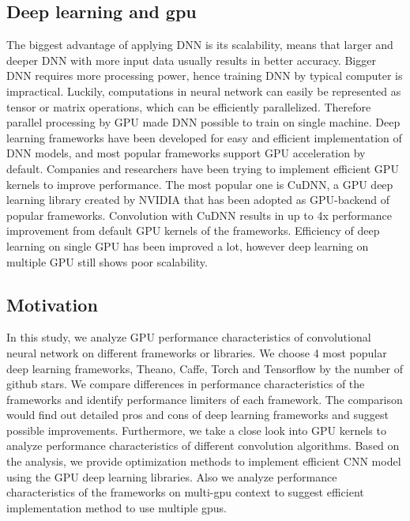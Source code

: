 \documentclass[conference]{IEEEtran}
\begin{document}
\subsection{Deep learning and gpu}
The biggest advantage of applying DNN is its scalability, means that larger and deeper DNN with more input data usually results in better accuracy.
Bigger DNN requires more processing power, hence training DNN by typical computer is impractical.
Luckily, computations in neural network can easily be represented as tensor or matrix operations, which can be efficiently parallelized.
Therefore parallel processing by GPU made DNN possible to train on single machine.
Deep learning frameworks have been developed for easy and efficient implementation of DNN models, and most popular frameworks support GPU acceleration by default.
\cite{} %
Companies and researchers have been trying to implement efficient GPU kernels to improve performance.
\cite{} %
The most popular one is CuDNN, a GPU deep learning library created by NVIDIA that has been adopted as GPU-backend of popular frameworks.
\cite{} %
Convolution with CuDNN results in up to 4x performance improvement from default GPU kernels of the frameworks.
\cite{} %
Efficiency of deep learning on single GPU has been improved a lot, however deep learning on multiple GPU still shows poor scalability.
\cite{} %

\subsection{Motivation}
In this study, we analyze GPU performance characteristics of convolutional neural network on different frameworks or libraries.
We choose 4 most popular deep learning frameworks, Theano, Caffe, Torch and Tensorflow by the number of github stars.
We compare differences in performance characteristics of the frameworks and identify performance limiters of each framework.
The comparison would find out detailed pros and cons of deep learning frameworks and suggest possible improvements.
Furthermore, we take a close look into GPU kernels to analyze performance characteristics of different convolution algorithms.
Based on the analysis, we provide optimization methods to implement efficient CNN model using the GPU deep learning libraries.
Also we analyze performance characteristics of the frameworks on multi-gpu context to suggest efficient implementation method to use multiple gpus.
\end{document}
